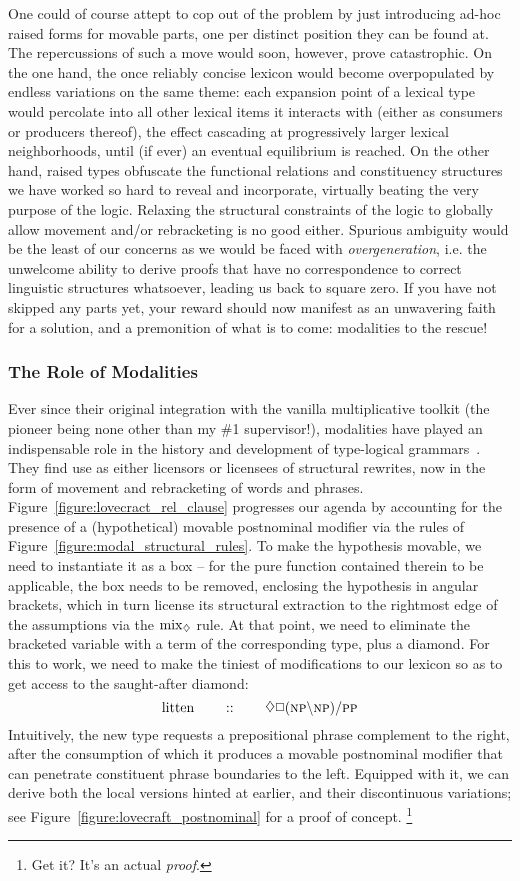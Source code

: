 One could of course attept to cop out of the problem by just introducing ad-hoc raised forms for movable parts, one per distinct position they can be found at. 
The repercussions of such a move would soon, however, prove catastrophic.
On the one hand, the once reliably concise lexicon would become overpopulated by endless variations on the same theme: each expansion point of a lexical type would percolate into all other lexical items it interacts with (either as consumers or producers thereof), the effect cascading at progressively larger lexical neighborhoods, until (if ever) an eventual equilibrium is reached.
On the other hand, raised types obfuscate the functional relations and constituency structures we have worked so hard to reveal and incorporate, virtually beating the very purpose of the logic.
Relaxing the structural constraints of the logic to globally allow movement and/or rebracketing is no good either.
Spurious ambiguity would be the least of our concerns as we would be faced with \textit{overgeneration}, i.e. the unwelcome ability to derive proofs that have no correspondence to correct linguistic structures whatsoever, leading us back to square zero.
If you have not skipped any parts yet, your reward should now manifest as an unwavering faith for a solution, and a premonition of what is to come: modalities to the rescue!

\subsubsection{The Role of Modalities}
Ever since their original integration with the vanilla multiplicative toolkit (the pioneer being none other than my \#1 supervisor!), modalities have played an indispensable role in the history and development of type-logical grammars~\cite{moortgat1996multimodal}.
They find use as either licensors or licensees of structural rewrites, now in the form of movement and rebracketing of words and phrases.
Figure~\ref{figure:lovecract_rel_clause} progresses our agenda by accounting for the presence of a (hypothetical) movable postnominal modifier via the rules of Figure~\ref{figure:modal_structural_rules}.
To make the hypothesis movable, we need to instantiate it as a box -- for the pure function contained therein to be applicable, the box needs to be removed, enclosing the hypothesis in angular brackets, which in turn license its structural extraction to the rightmost edge of the assumptions via the $\rulestyle{mix}_{\diamond}$ rule.
At that point, we need to eliminate the bracketed variable with a term of the corresponding type, plus a diamond.
For this to work, we need to make the tiniest of modifications to our lexicon so as to get access to the saught-after diamond:
\[
	\w{litten} \qquad :: \qquad \diamond\Box (\np\divleft\np)\divright\pp
\]
Intuitively, the new type requests a prepositional phrase complement to the right, after the consumption of which it produces a movable postnominal modifier that can penetrate constituent phrase boundaries to the left.
Equipped with it, we can derive both the local versions hinted at earlier, and their discontinuous variations; see Figure~\ref{figure:lovecraft_postnominal} for a proof of concept.%
\footnote{Get it? It's an actual \textit{proof}.} 

